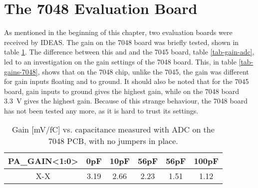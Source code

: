 \documentclass[../main/thesis.tex]{subfiles}
\begin{document}

\section{The 7048 Evaluation Board}
\label{ide-7048}

As mentioned in the beginning of this chapter, two evaluation boards were received by IDEAS. The gain on the 7048 board was briefly tested, shown in table \ref{tab-gain-adc-7048}. The difference between this and and the 7045 board, table \ref{tab-gain-adc}, led to an investigation on the gain settings of the 7048 board. This, in table \ref{tab-gains-7048}, shows that on the 7048 chip, unlike the 7045, the gain was different for gain inputs floating and to ground. It should also be noted that for the 7045 board, gain inputs to ground gives the highest gain, while on the 7048 board 3.3~V gives the highest gain. Because of this strange behaviour, the 7048 board has not been tested any more, as it is hard to trust its settings. 

\begin{table}[h!]
	\begin{center}
		\caption{Gain [mV/fC] vs. capacitance measured with ADC on the 7048 PCB, with no jumpers in place.}
		\label{tab-gain-adc-7048}
		\begin{tabular}{cccccc}\toprule
			\textbf{PA\_GAIN<1:0>} & \textbf{0pF}  & \textbf{10pF} & \textbf{56pF} & \textbf{56pF} & \textbf{100pF} \\ \midrule
			X-X     & 3.19 & 2.66  & 2.23  & 1.51 & 1.12   \\ \bottomrule
		\end{tabular}
	\end{center}
\end{table}
\end{document}
